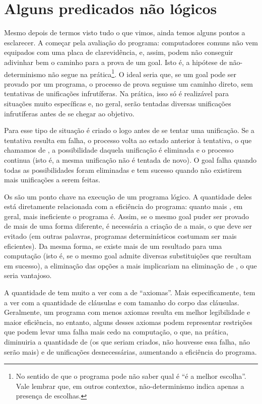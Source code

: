 \documentclass{article}
\begin{document}
\section{Alguns predicados não lógicos}

Mesmo depois de termos visto tudo o que vimos, ainda temos alguns
pontos a esclarecer. A começar pela avaliação do programa:
computadores comuns não vem equipados com uma placa de clarevidência,
e, assim, podem não conseguir adivinhar bem o caminho para a prova de
um goal. Isto é, a hipótese de não-determinismo não segue na
prática\footnote{No sentido de que o programa pode não saber qual é
  ``é a melhor escolha''. Vale lembrar que, em outros contextos,
  não-determinismo indica apenas a presença de escolhas. }. O ideal
seria que, se um goal pode ser provado por um programa, o processo de
prova seguisse um caminho direto, sem tentativas de unificações
infrutíferas. Na prática, isso só é realizável para situações muito
específicas e, no geral, serão tentadas diversas unificações
infrutíferas antes de se chegar ao objetivo.

Para esse tipo de situação é criado o  logo
antes de se tentar uma unificação. Se a tentativa resulta em falha, o
processo volta ao estado anterior à tentativa, o que chamamos de
, a possibilidade daquela unificação é
eliminada e o processo continua (isto é, a mesma unificação não é
tentada de novo). O goal falha quando todas as possibilidades foram
eliminadas e tem sucesso quando não existirem mais unificações a serem
feitas.

Os  são um ponto chave na execução de um
programa lógico. A quantidade deles está diretamente relacionada com a
eficiência do programa: quanto mais , em geral,
mais ineficiente o programa é. Assim, se o mesmo goal puder ser
provado de mais de uma forma diferente, é necessária a criação de
 a mais, o que deve ser evitado (em outras
palavras, programas determinísticos costumam ser mais eficientes). Da
mesma forma, se existe mais de um resultado para uma computação (isto
é, se o mesmo goal admite diversas substituições que resultam em
sucesso), a eliminação das opções a mais implicariam na eliminação de
, o que seria vantajoso.

A quantidade de  tem muito a ver com a de
``axiomas''. Mais especificamente, tem a ver com a quantidade de
cláusulas e com tamanho do corpo das cláusulas. Geralmente, um
programa com menos axiomas resulta em melhor legibilidade e maior
eficiência, no entanto, alguns desses axiomas podem representar
restrições que podem levar uma falha mais cedo na computação, o que,
na prática, diminuiria a quantidade de  (os que
seriam criados, não houvesse essa falha, não serão mais) e de
unificações desnecessárias, aumentando a eficiência do programa.
\end{document}
